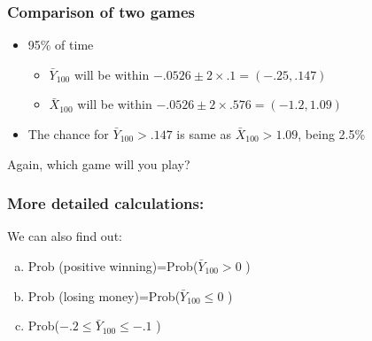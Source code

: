 \documentclass[
  ignorenonframetext,
]{beamer}
\providecommand{\tightlist}{%
  \setlength{\itemsep}{0pt}\setlength{\parskip}{0pt}}
\begin{document}
\begin{frame}
\frametitle{Comparison of two games}

\begin{itemize}
\tightlist
\item
  95\% of time

  \begin{itemize}
  \tightlist
  \item
    \(\bar{Y}_{100}\) will be within
    \(-.0526 \pm 2\times .1 = (-.25, .147)\)
  \item
    \(\bar{X}_{100}\) will be within
    \(-.0526 \pm 2\times .576 = (-1.2, 1.09)\)
  \end{itemize}
\item
  The chance for \(\bar{Y}_{100} > .147\) is same as
  \(\bar{X}_{100} > 1.09\), being 2.5\%
\end{itemize}

\begin{center}
Again, which game will you play?
\end{center}
\end{frame}

\begin{frame}
\frametitle{More detailed calculations:}

We can also find out:

\begin{enumerate}
[a)]
\tightlist
\item
  Prob (positive winning)=Prob(\(\bar{Y}_{100} > 0\) )
\item
  Prob (losing money)=Prob(\(\bar{Y}_{100} \leq 0\) )
\item
  Prob(\(-.2 \leq \bar{Y}_{100} \leq -.1\) )
\end{enumerate}
\end{frame}
\end{document}
